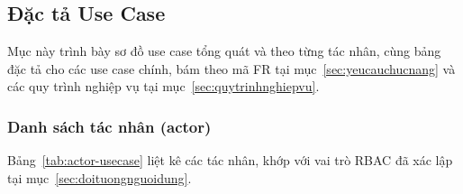 %

\subsection*{Đặc tả Use Case}
\label{subsec:usecase}

Mục này trình bày sơ đồ use case tổng quát và theo từng tác nhân, cùng bảng đặc tả cho các use case chính, bám theo mã FR tại mục~\ref{sec:yeucauchucnang} và các quy trình nghiệp vụ tại mục~\ref{sec:quytrinhnghiepvu}.

\subsubsection*{Danh sách tác nhân (actor)}

Bảng~\ref{tab:actor-usecase} liệt kê các tác nhân, khớp với vai trò RBAC đã xác lập tại mục~\ref{sec:doituongnguoidung}.

